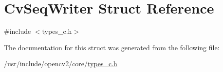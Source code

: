 \hypertarget{structCvSeqWriter}{\section{Cv\-Seq\-Writer Struct Reference}
\label{structCvSeqWriter}
}


{\ttfamily \#include $<$types\-\_\-c.\-h$>$}



The documentation for this struct was generated from the following file\-:\begin{DoxyCompactItemize}
\item 
/usr/include/opencv2/core/\hyperlink{core_2types__c_8h}{types\-\_\-c.\-h}\end{DoxyCompactItemize}
